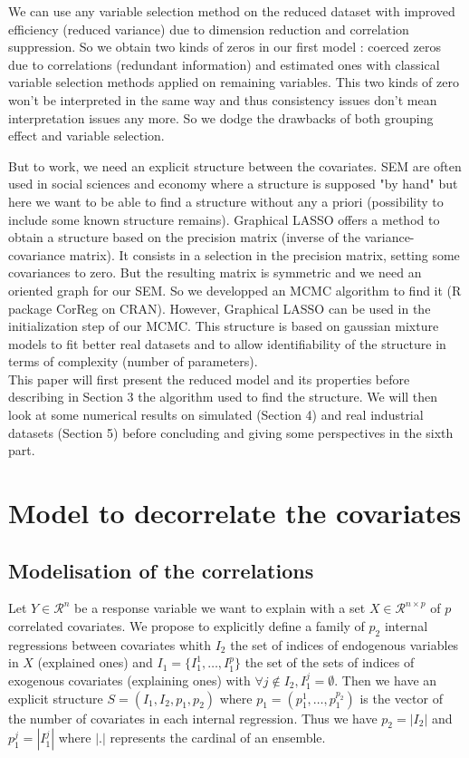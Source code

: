 \documentclass[11pt,a4paper]{article}
\begin{document}
	We can use any variable selection method on the reduced dataset with improved efficiency (reduced variance) due to dimension reduction and correlation suppression. So we obtain two kinds of zeros in our first model : coerced zeros due to correlations (redundant information) and estimated ones with classical variable selection methods applied on remaining variables. This two kinds of zero won't be interpreted in the same way and thus consistency issues don't mean interpretation issues any more. So we dodge the drawbacks of both grouping effect and variable selection.
 	 	
But to work, we need an explicit structure between the covariates. SEM are often used in social sciences and economy where a structure is supposed "by hand" but here we want to be able to find a structure without any a priori (possibility to include some known structure remains). Graphical LASSO \cite{friedman2008sparse} offers a method to obtain a structure based on the precision matrix (inverse of the variance-covariance matrix). It consists in a selection in the precision matrix, setting some covariances to zero. But the resulting matrix is symmetric and we need an oriented graph for our SEM. So we developped an MCMC algorithm to find it (R package CorReg on CRAN). However, Graphical LASSO can be used in the initialization step of our MCMC. This structure is based on gaussian mixture models to fit better real datasets and to allow identifiability of the structure in terms of complexity (number of parameters).
 	\\
 	
 	This paper will first present the reduced model and its properties before describing in Section 3 the algorithm used to find the structure.
 	We will then look at some numerical results on simulated (Section 4) and real industrial datasets (Section 5) before concluding and giving some perspectives in the sixth part.
	
\section{Model to decorrelate the covariates}

\subsection{Modelisation of the correlations}
Let $Y \in \mathcal{R}^n$ be a response variable we want to explain with a set $X \in \mathcal{R}^{n\times p}$ of $p$ correlated covariates.
We propose to explicitly define a family of $p_2$ internal regressions between covariates whith $I_2$ the set of indices of endogenous variables in $X$ (explained ones) and $I_1=\{I_1^1,\dots,I_1^p \}$ the set of the sets of indices of exogenous covariates (explaining ones) with $\forall j \notin I_2, I_1^j=\emptyset$. Then we have an explicit structure $S=(I_1,I_2,p_1,p_2)$ where $p_1=(p_1^1,\dots,p_1^{p_2})$ is the vector of the number of covariates in each internal regression. Thus we have $p_2=| I_2|$ and $p_1^j=|I_1^j|$ where $|.|$ represents the cardinal of an ensemble.
\end{document}
